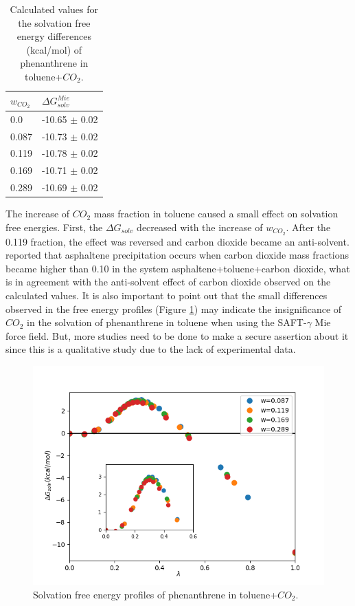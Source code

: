 \FloatBarrier
\begin{table}[H]
\centering
  \caption{Calculated values for the solvation free energy differences (kcal/mol) of phenanthrene in toluene+$CO_{2}$.}
  \label{tbl:solv3}
  \begin{tabular}{ll}
    \hline
    \hline
      $w_{CO_{2}}$ & $\Delta G_{solv}^{Mie}$ \\
    \hline
    0.0    & -10.65 $\pm$ 0.02   \\
    0.087  & -10.73 $\pm$ 0.02   \\
    0.119  & -10.78 $\pm$ 0.02   \\
    0.169  & -10.71 $\pm$ 0.02   \\
    0.289  & -10.69 $\pm$ 0.02   \\
    \hline
    \hline
  \end{tabular}
\end{table}
\FloatBarrier

The increase of $CO_{2}$ mass fraction in toluene caused a small effect on solvation free energies. First, the $\Delta G_{solv}$ decreased with the increase of $w_{CO_{2}}$. After the 0.119 fraction, the effect was reversed and carbon dioxide became an anti-solvent.  reported that asphaltene precipitation occurs when carbon dioxide mass fractions became higher than 0.10 in the system asphaltene+toluene+carbon dioxide, what is in agreement with the anti-solvent effect of carbon dioxide observed on the calculated values. It is also important to point out that the small differences observed in the free energy profiles (Figure \ref{fig:Figure_1}) may indicate the insignificance of $CO_{2}$ in the solvation of phenanthrene in toluene when using the SAFT-$\gamma$ Mie force field. But, more studies need to be done to make a secure assertion about it since this is a qualitative study due to the lack of experimental data.   

\begin{figure}[H]
\centering
\includegraphics[width=0.9\linewidth]{Figures/Figure_1}
\caption{Solvation free energy profiles of phenanthrene in toluene+$CO_{2}$.}
\label{fig:Figure_1}
\end{figure}


